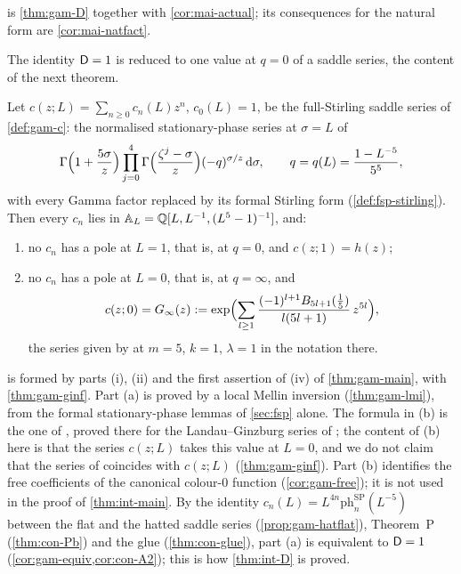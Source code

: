  is \cref{thm:gam-D} together with \cref{cor:mai-actual}; its consequences for the natural form are \cref{cor:mai-natfact}.

The identity $\mathsf{D}=1$ is reduced to one value at $q=0$ of a saddle series, the content of the next theorem.

\begin{thm}
\label{thm:int-gamma}
Let $c(z;L)=\sum_{n\geq0}c_n(L)z^n$, $c_0(L)=1$, be the full-Stirling saddle series of \cref{def:gam-c}: the normalised stationary-phase series at $\sigma=L$ of
\[
\Gamma\Bigl(1+\frac{5\sigma}{z}\Bigr)\prod_{j=0}^{4}\Gamma\Bigl(\frac{\zeta^j-\sigma}{z}\Bigr)(-q)^{\sigma/z}\,\mathrm{d}\sigma,\qquad q=q(L)=\frac{1-L^{-5}}{5^5},
\]
with every Gamma factor replaced by its formal Stirling form (\cref{def:fsp-stirling}). Then every $c_n$ lies in $\mathbb{A}_{L}=\mathbb{Q}[L,L^{-1},(L^5-1)^{-1}]$, and:
\begin{enumerate}
\item[(a)] no $c_n$ has a pole at $L=1$, that is, at $q=0$, and $c(z;1)=h(z)$;
\item[(b)] no $c_n$ has a pole at $L=0$, that is, at $q=\infty$, and
\[
c(z;0)=G_{\infty}(z):=\exp\Bigl(\sum_{l\geq1}\frac{(-1)^{l+1}B_{5l+1}(\frac15)}{l(5l+1)}\,z^{5l}\Bigr),
\]
the series given by \cite[Lemma~7.7, (37)]{GJR18} at $m=5$, $k=1$, $\lambda=1$ in the notation there.
\end{enumerate}
\end{thm}

 is formed by parts (i), (ii) and the first assertion of (iv) of \cref{thm:gam-main}, with \cref{thm:gam-ginf}. Part (a) is proved by a local Mellin inversion (\cref{thm:gam-lmi}), from the formal stationary-phase lemmas of \cref{sec:fsp} alone. The formula in (b) is the one of \cite[Lemma~7.7, (37)]{GJR18}, proved there for the Landau--Ginzburg series of \cite{GJR18}; the content of (b) here is that the series $c(z;L)$ takes this value at $L=0$, and we do not claim that the series of \cite{GJR18} coincides with $c(z;L)$ (\cref{thm:gam-ginf}). Part (b) identifies the free coefficients of the canonical colour-$0$ function (\cref{cor:gam-free}); it is not used in the proof of \cref{thm:int-main}. By the identity $c_n(L)=L^{4n}\mathrm{ph}^{\mathrm{SP}}_n(L^{-5})$ between the flat and the hatted saddle series (\cref{prop:gam-hatflat}), Theorem~P (\cref{thm:con-Pb}) and the glue (\cref{thm:con-glue}), part (a) is equivalent to $\mathsf{D}=1$ (\cref{cor:gam-equiv,cor:con-A2}); this is how \cref{thm:int-D} is proved.

